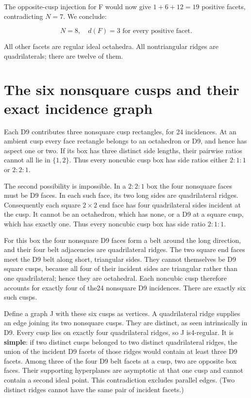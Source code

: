 \documentclass[11pt]{article}
\begin{document}
The opposite-cusp injection for F would now give \(1+6+12=19\) positive facets, contradicting \(N=7\). We conclude:

\[
 \boxed{N=8,\quad d(F)=3\text{ for every positive facet}.} \tag{3}
\]

All other facets are regular ideal octahedra. All nontriangular ridges are quadrilaterals; there are twelve of them.

\section{The six nonsquare cusps and their exact incidence graph}\label{the-six-nonsquare-cusps-and-their-exact-incidence-graph}

Each D9 contributes three nonsquare cusp rectangles, for 24 incidences. At an ambient cusp every face rectangle belongs to an octahedron or D9, and hence has aspect one or two. If its box has three distinct side lengths, their pairwise ratios cannot all lie in \(\{1,2\}\). Thus every noncubic cusp box has side ratios either \(2:1:1\) or \(2:2:1\).

The second possibility is impossible. In a \(2:2:1\) box the four nonsquare faces must be D9 faces. In each such face, its two long sides are quadrilateral ridges. Consequently each square \(2\times2\) end face has four quadrilateral sides incident at the cusp. It cannot be an octahedron, which has none, or a D9 at a square cusp, which has exactly one. Thus every noncubic cusp box has side ratio \(2:1:1\).

For this box the four nonsquare D9 faces form a belt around the long direction, and their four belt adjacencies are quadrilateral ridges. The two square end faces meet the D9 belt along short, triangular sides. They cannot themselves be D9 square cusps, because all four of their incident sides are triangular rather than one quadrilateral; hence they are octahedral. Each noncubic cusp therefore accounts for exactly four of the24 nonsquare D9 incidences. There are exactly six such cusps.

Define a graph J with these six cusps as vertices. A quadrilateral ridge supplies an edge joining its two nonsquare cusps. They are distinct, as seen intrinsically in D9. Every cusp lies on exactly four quadrilateral ridges, so J is4-regular. It is \textbf{simple}: if two distinct cusps belonged to two distinct quadrilateral ridges, the union of the incident D9 facets of those ridges would contain at least three D9 facets. Among three of the four D9 belt facets at a cusp, two are opposite box faces. Their supporting hyperplanes are asymptotic at that one cusp and cannot contain a second ideal point. This contradiction excludes parallel edges. (Two distinct ridges cannot have the same pair of incident facets.)
\end{document}
